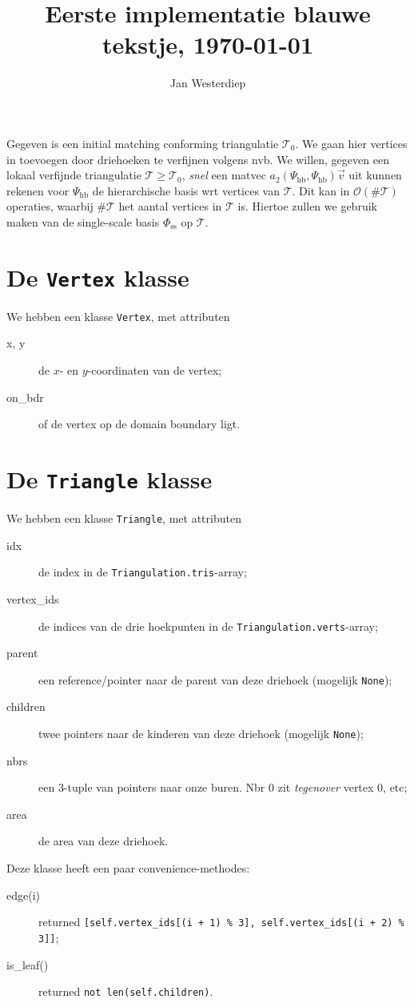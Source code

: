 \documentclass[11pt,a4paper]{amsart}
\theoremstyle{definition}
\newcommand{\T}{{\mathcal T}}
\begin{document}
\title{Eerste implementatie blauwe tekstje, \today}
\author{Jan Westerdiep}
\maketitle

Gegeven is een initial matching conforming triangulatie $\T_0$. We gaan hier
vertices in toevoegen door driehoeken te verfijnen volgens nvb. We willen, gegeven
een lokaal verfijnde triangulatie $\T \geq \T_0$, \emph{snel} een matvec
$a_2(\Psi_{\text{hb}}, \Psi_{\text{hb}}) \vec v$ uit kunnen rekenen voor
$\Psi_{\text{hb}}$ de hierarchische basis wrt vertices van $\T$. Dit kan in
$\mathcal O(\# \T)$ operaties, waarbij $\# \T$ het aantal vertices in $\T$ is.
Hiertoe zullen we gebruik maken van de single-scale basis $\Phi_{\text{ss}}$ op
$\T$.

\section*{De \texttt{Vertex} klasse}
We hebben een klasse \texttt{Vertex}, met attributen
\begin{description}
  \item[x, y] de $x$- en $y$-coordinaten van de vertex;
  \item[on\_bdr] of de vertex op de domain boundary ligt.
\end{description}

\section*{De \texttt{Triangle} klasse}
We hebben een klasse \texttt{Triangle}, met attributen
\begin{description}
  \item[idx] de index in de \texttt{Triangulation.tris}-array;
  \item[vertex\_ids] de indices van de drie hoekpunten in de \texttt{Triangulation.verts}-array;
  \item[parent] een reference/pointer naar de parent van deze driehoek (mogelijk \texttt{None});
  \item[children] twee pointers naar de kinderen van deze driehoek (mogelijk \texttt{None});
  \item[nbrs] een 3-tuple van pointers naar onze buren. Nbr $0$ zit \emph{tegenover} vertex 0, etc;
  \item[area] de area van deze driehoek.
\end{description}
Deze klasse heeft een paar convenience-methodes:
\begin{description}
  \item[edge(i)] returned \texttt{[self.vertex\_ids[(i + 1) \% 3], self.vertex\_ids[(i + 2) \% 3]]};
  \item[is\_leaf()] returned \texttt{not len(self.children)}.
\end{description}
\end{document}
